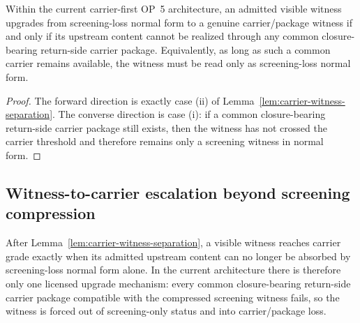 \begin{corollary}
\label{cor:carrier-witness-upgrade-criterion}
Within the current carrier-first OP~5 architecture, an admitted visible witness upgrades from screening-loss normal form to a genuine carrier/package witness if and only if its upstream content cannot be realized through any common closure-bearing return-side carrier package. Equivalently, as long as such a common carrier remains available, the witness must be read only as screening-loss normal form.
\end{corollary}

\begin{proof}
The forward direction is exactly case (ii) of Lemma~\ref{lem:carrier-witness-separation}. The converse direction is case (i): if a common closure-bearing return-side carrier package still exists, then the witness has not crossed the carrier threshold and therefore remains only a screening witness in normal form.
\end{proof}


\subsection{Witness-to-carrier escalation beyond screening compression}
\label{sec:witness-to-carrier-escalation}

\begin{remark}
After Lemma~\ref{lem:carrier-witness-separation}, a visible witness reaches carrier grade exactly when its admitted upstream content can no longer be absorbed by screening-loss normal form alone. In the current architecture there is therefore only one licensed upgrade mechanism: every common closure-bearing return-side carrier package compatible with the compressed screening witness fails, so the witness is forced out of screening-only status and into carrier/package loss.
\end{remark}

